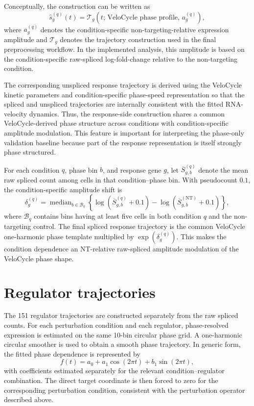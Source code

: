 \documentclass[supplement,onefignum,onetabnum]{siamart251216}
\begin{document}
Conceptually, the construction can be written as
\[
\widehat s_g^{(q)}(t)
=
\mathcal{T}_g\!\left(t;\,\text{VeloCycle phase profile},\,a_g^{(q)}\right),
\]
where \(a_g^{(q)}\) denotes the condition-specific non-targeting-relative expression amplitude and \(\mathcal{T}_g\) denotes the trajectory construction used in the final preprocessing workflow. In the implemented analysis, this amplitude is based on the condition-specific raw-spliced log-fold-change relative to the non-targeting condition.

The corresponding unspliced response trajectory is derived using the VeloCycle kinetic parameters and condition-specific phase-speed representation so that the spliced and unspliced trajectories are internally consistent with the fitted RNA-velocity dynamics. Thus, the response-side construction shares a common VeloCycle-derived phase structure across conditions with condition-specific amplitude modulation. This feature is important for interpreting the phase-only validation baseline because part of the response representation is itself strongly phase structured.

For each condition \(q\), phase bin \(b\), and response gene \(g\), let \(\overline S_{g,b}^{(q)}\) denote the mean raw spliced count among cells in that condition--phase bin. With pseudocount \(0.1\), the condition-specific amplitude shift is
\[
\delta_g^{(q)}
=
\operatorname{median}_{b\in\mathcal B_q}
\left\{
\log\!\left(\overline S_{g,b}^{(q)}+0.1\right)
-
\log\!\left(\overline S_{g,b}^{(\mathrm{NT})}+0.1\right)
\right\},
\]
where \(\mathcal B_q\) contains bins having at least five cells in both condition \(q\) and the non-targeting control. The final spliced response trajectory is the common VeloCycle one-harmonic phase template multiplied by \(\exp(\delta_g^{(q)})\). This makes the condition dependence an NT-relative raw-spliced amplitude modulation of the VeloCycle phase shape.

\section{Regulator trajectories}

The 151 regulator trajectories are constructed separately from the raw spliced counts. For each perturbation condition and each regulator, phase-resolved expression is estimated on the same 10-bin circular phase grid. A one-harmonic circular smoother is used to obtain a smooth phase trajectory. In generic form, the fitted phase dependence is represented by
\[
f(t)=a_0+a_1\cos(2\pi t)+b_1\sin(2\pi t),
\]
with coefficients estimated separately for the relevant condition--regulator combination. The direct target coordinate is then forced to zero for the corresponding perturbation condition, consistent with the perturbation operator described above.
\end{document}
